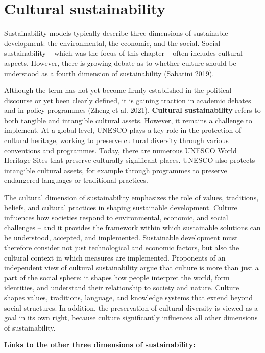 \documentclass[
  a4paper,
  DIV=11,
  numbers=noendperiod,
  oneside,
  openany]{scrreprt}
\begin{document}
\section{Cultural sustainability}\label{cultural-sustainability}

Sustainability models typically describe three dimensions of sustainable
development: the environmental, the economic, and the social. Social
sustainability -- which was the focus of this chapter -- often includes
cultural aspects. However, there is growing debate as to whether culture
should be understood as a fourth dimension of sustainability (Sabatini
2019).

Although the term has not yet become firmly established in the political
discourse or yet been clearly defined, it is gaining traction in
academic debates and in policy programmes (Zheng et al. 2021).
\textbf{Cultural sustainability} refers to both tangible and intangible
cultural assets. However, it remains a challenge to implement. At a
global level, UNESCO plays a key role in the protection of cultural
heritage, working to preserve cultural diversity through various
conventions and programmes. Today, there are numerous UNESCO World
Heritage Sites that preserve culturally significant places. UNESCO also
protects intangible cultural assets, for example through programmes to
preserve endangered languages or traditional practices.

The cultural dimension of sustainability emphasizes the role of values,
traditions, beliefs, and cultural practices in shaping sustainable
development. Culture influences how societies respond to environmental,
economic, and social challenges -- and it provides the framework within
which sustainable solutions can be understood, accepted, and
implemented. Sustainable development must therefore consider not just
technological and economic factors, but also the cultural context in
which measures are implemented. Proponents of an independent view of
cultural sustainability argue that culture is more than just a part of
the social sphere: it shapes how people interpret the world, form
identities, and understand their relationship to society and nature.
Culture shapes values, traditions, language, and knowledge systems that
extend beyond social structures. In addition, the preservation of
cultural diversity is viewed as a goal in its own right, because culture
significantly influences all other dimensions of sustainability.

\textbf{Links to the other three dimensions of sustainability:}
\end{document}
